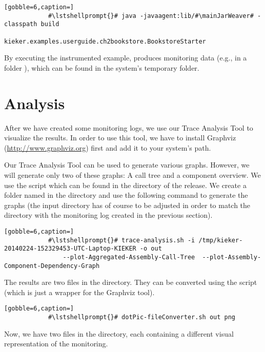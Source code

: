 		\setBashListing
		\begin{lstlisting}[gobble=6,caption=]			
			#\lstshellprompt{}# java -javaagent:lib/#\mainJarWeaver# -classpath build
			    kieker.examples.userguide.ch2bookstore.BookstoreStarter
		\end{lstlisting} 
		
		\noindent
		By executing the instrumented example, \Kieker{} produces monitoring data (e.g., in a folder ), which can be found in the system's temporary folder.
	
	\section{Analysis}
	
		After we have created some monitoring logs, we use our Trace Analysis Tool to visualize the results. In order to use this tool, we have to install Graphviz (\url{http://www.graphviz.org}) first and add it to your system's path. \\

		
		\noindent
		Our Trace Analysis Tool can be used to generate various graphs. However, we will generate only two of these graphs: A call tree and a component overview. We use the script  which can be found in the  directory of the release. We create a folder named  in the  directory and use the following command to generate the graphs (the input directory has of course to be adjusted in order to match the directory with the monitoring log created in the previous section).
		
		\setBashListing
		\begin{lstlisting}[gobble=6,caption=]			
			#\lstshellprompt{}# trace-analysis.sh -i /tmp/kieker-20140224-152329453-UTC-Laptop-KIEKER -o out 
			    --plot-Aggregated-Assembly-Call-Tree  --plot-Assembly-Component-Dependency-Graph
		\end{lstlisting} 
		
		\noindent
		The results are two  files in the  directory. They can be converted using the script  (which is just a wrapper for the Graphviz tool).
		
		\setBashListing
		\begin{lstlisting}[gobble=6,caption=]			
			#\lstshellprompt{}# dotPic-fileConverter.sh out png
		\end{lstlisting} 
		
		\noindent
		Now, we have two  files in the  directory, each containing a different visual representation of the monitoring.		